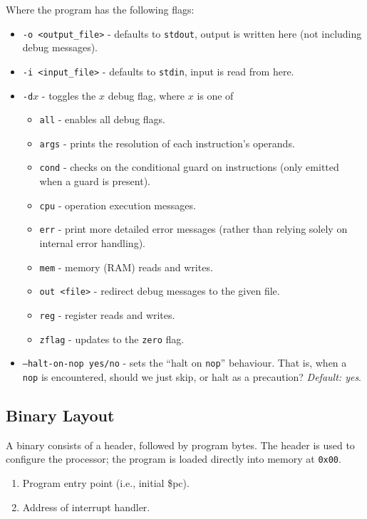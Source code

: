 \documentclass[10pt]{article}
\begin{document}
    Where the program has the following flags:
    \begin{itemize}
        \item \texttt{-o <output\_file>} - defaults to \texttt{stdout}, output is written here (not including debug messages).
        \item \texttt{-i <input\_file>} - defaults to \texttt{stdin}, input is read from here.
        \item \texttt{-d$x$} - toggles the $x$ debug flag, where $x$ is one of
        \begin{itemize}
            \item \texttt{all} - enables all debug flags.
            \item \texttt{args} - prints the resolution of each instruction's operands.
            \item \texttt{cond} - checks on the conditional guard on instructions (only emitted when a guard is present).
            \item \texttt{cpu} - operation execution messages.
            \item \texttt{err} - print more detailed error messages (rather than relying solely on internal error handling).
            \item \texttt{mem} - memory (RAM) reads and writes.
            \item \texttt{out <file>} - redirect debug messages to the given file.
            \item \texttt{reg} - register reads and writes.
            \item \texttt{zflag} - updates to the \texttt{zero} flag.
        \end{itemize}
        \item \texttt{--halt-on-nop yes/no} - sets the ``halt on \texttt{nop}'' behaviour.
        That is, when a \texttt{nop} is encountered, should we just skip, or halt as a precaution?
        \textit{Default: yes}.
    \end{itemize}

    \subsection{Binary Layout}

    A binary consists of a header, followed by program bytes.
    The header is used to configure the processor; the program is loaded directly into memory at \texttt{0x00}.
    \begin{enumerate}
        \item Program entry point (i.e., initial \$pc).
        \item Address of interrupt handler.
    \end{enumerate}
\end{document}

